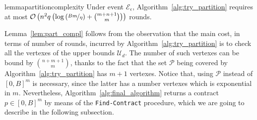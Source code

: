 %
\begin{restatable}{lemma}{partitioncomplexity}\label{lem:part_compl}
	Under event $\mathcal{E}_\epsilon$, Algorithm~\ref{alg:try_partition} requires at most
	$\mathcal{O} \left( n^2 q \left( \log \left(\nicefrac{Bm}{\eta}\right) + \binom{ m + n +1}{m} \right) \right)$ rounds. 
\end{restatable}
%
Lemma~\ref{lem:part_compl} follows from the observation that the main cost, in terms of number of rounds, incurred by Algorithm~\ref{alg:try_partition} is to check all the vertexes of the upper bounds $\mathcal{U}_d$.
%
The number of such vertexes can be bound by $\binom{n + m + 1}{m} $, thanks to the fact that the set $\mathcal{P}$ being covered by Algorithm~\ref{alg:try_partition} has $m+1$ vertexes.
%
Notice that, using $\mathcal{P}$ instead of $[0,B]^m$ is necessary, since the latter has a number vertexes which is exponential in $m$.
%
Nevertheless, Algorithm~\ref{alg:final_algorithm} returns a contract $p \in [0,B]^m$ by means of the \texttt{Find-Contract} procedure, which we are going to describe in the following subsection.  
%



